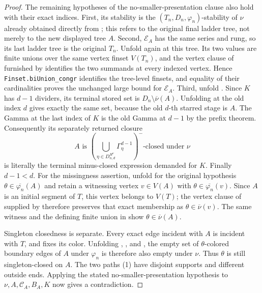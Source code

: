 \begin{proof}
The remaining hypotheses of the no-smaller-presentation clause also hold
with their exact indices.  First, its stability is the
$(T_n,D_n,\varphi_n)$-stability of $\nu$ already obtained directly from
; this refers to the original final
ladder tree, not merely to the new displayed tree $A$.  Second,
$\mathcal E_A$ has the same series and rung, so its last ladder tree is
the original $T_n$.  Unfold  again at this
tree.  Its two values are finite unions over the same vertex finset
$V(T_n)$, and the vertex clause of  furnished by
 identifies the two
 summands at every indexed vertex.  Hence
\texttt{Finset.biUnion\_congr} identifies the tree-level finsets, and
equality of their cardinalities proves the unchanged large bound for
$\mathcal E_A$.  Third, unfold
.  Since $K$ has $d-1$ dividers,
its terminal stored set is
$D_n\setminus\overline\nu(A)$.  Unfolding
 at the old index $d$ gives exactly the
same set, because the old $d$-th starred stage is $A$.  The Gamma at the
last index of $K$ is the old Gamma at $d-1$ by the prefix theorem.
Consequently its separately returned closure
\[
 A\text{ is }
 \left(\bigcup_{\eta\in D^{H^\nu}_{n,d}}\Gamma^{d-1}_\eta\right)^-
 \text{-closed under }\nu
\]
is literally the terminal minus-closed expression demanded for $K$.
Finally $d-1<d$.  For the missingness assertion, unfold
 for the original hypothesis
$\theta\in\overline{\varphi_n}(A)$ and retain a witnessing vertex
$v\in V(A)$ with $\theta\in\overline{\varphi_n}(v)$.  Since $A$ is an
initial segment of $T$, this vertex belongs to $V(T)$; the vertex clause
of  supplied by
 therefore preserves that exact
membership as $\theta\in\overline\nu(v)$.  The same witness and the
defining finite union in  show
$\theta\in\overline\nu(A)$.

Singleton closedness is separate.  Every exact edge incident with $A$ is
incident with $T$, and  fixes its
color.  Unfolding ,
, and , the empty set
of $\theta$-colored boundary edges of $A$ under $\varphi_n$ is therefore
also empty under $\nu$.  Thus $\theta$ is still singleton-closed on $A$.
The two paths (1) have disjoint supports and different outside ends.
Applying the stated no-smaller-presentation hypothesis to
$\nu,A,\mathcal C_A,B_A,K$ now gives a contradiction.

\end{proof}
